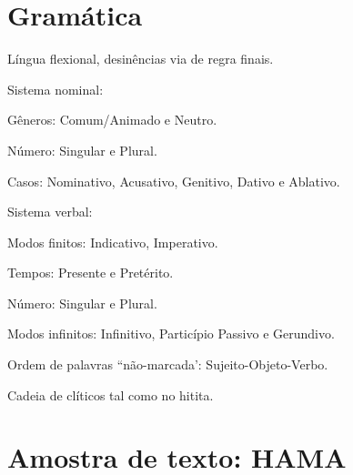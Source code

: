 \documentclass[article]{luvita}
\begin{document}
\chapter{Gramática}

\begin{compactitem}
	\item Língua flexional, desinências via de regra finais.
	\item Sistema nominal:
	\begin{compactitem}
		\item Gêneros: Comum\slash{}Animado e Neutro.
		\item Número: Singular e Plural.
		\item Casos: Nominativo, Acusativo, Genitivo, Dativo e Ablativo.
	\end{compactitem}
	\item Sistema verbal:
	\begin{compactitem}
		\item Modos finitos: Indicativo, Imperativo.
		\item Tempos: Presente e Pretérito.
		\item Número: Singular e Plural.
		\item Modos infinitos: Infinitivo, Particípio Passivo e Gerundivo.
	\end{compactitem}
	\item Ordem de palavras ``não-marcada': Sujeito-Objeto-Verbo.
	\item Cadeia de clíticos tal como no hitita.
\end{compactitem}

\chapter{Amostra de texto: HAMA }
\end{document}

